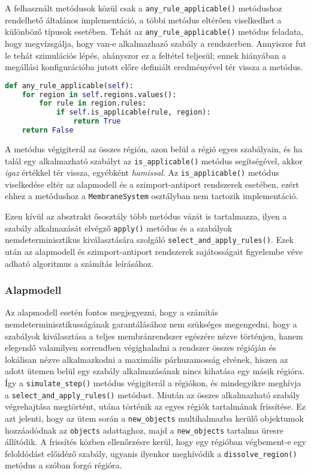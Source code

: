 A felhasznált metódusok közül csak a \verb|any_rule_applicable()| metódushoz rendelhető általános implementáció, a többi metódus eltérően viselkedhet a különböző típusok esetében. Tehát az \verb|any_rule_applicable()| metódus feladata, hogy megvizsgálja, hogy van-e alkalmazhazó szabály a rendszerben. Annyiszor fut le tehát szimulációs lépés, ahányszor ez a feltétel teljesül; ennek hiányában a megállási konfigurációba jutott előre definiált eredményével tér vissza a metódus.

\begin{lstlisting}[language={Python}]
def any_rule_applicable(self):
	for region in self.regions.values():
		for rule in region.rules:
			if self.is_applicable(rule, region):
				return True
	return False
\end{lstlisting}

A metódus végigiterál az összes régión, azon belül a régió egyes szabályain, és ha talál egy alkalmazható szabályt az \verb|is_applicable()| metódus segítségével, akkor \textit{igaz} értékkel tér vissza, egyébként \textit{hamissal}.
Az \verb|is_applicable()| metódus viselkedése eltér az alapmodell és a szimport-antiport rendszerek esetében, ezért ehhez a metódushoz a \verb|MembraneSystem| osztályban nem tartozik implementáció.

Ezen kívül az absztrakt ősosztály több metódus vázát is tartalmazza, ilyen a szabály alkalmazását elvégző \verb|apply()| metódus és a szabályok nemdeterminisztikus kiválasztására szolgáló \verb|select_and_apply_rules()|.
Ezek után az alapmodell és szimport-antiport rendszerek sajátosságait figyelembe véve adható algoritmus a számítás leírásához.

\subsubsection{Alapmodell}

Az alapmodell esetén fontos megjegyezni, hogy a számítás nemdeterminisztikusságának garantálásához nem szükséges megengedni, hogy a szabályok kiválasztása a teljes membránrendszer egészére nézve történjen, hanem elegendő valamilyen sorrendben végighaladni a rendszer összes régióján és lokálisan nézve alkalmazkodni a maximális párhuzamosság elvének, hiszen az adott ütemen belül egy szabály alkalmazásának nincs kihatása egy másik régióra. Így a \verb|simulate_step()| metódus végigiterál a régiókon, és mindegyikre meghívja a \verb|select_and_apply_rules()| metódust. Miután az összes alkalmazható szabály végrehajtása megtörtént, utána történik az egyes régiók tartalmának frissítése. Ez azt jelenti, hogy az ütem során a \verb|new_objects| multihalmazba kerülő objektumok hozzáadódnak az \verb|objects| adattaghoz, majd a \verb|new_objects| tartalma üresre állítódik. A frissítés közben ellenőrzésre kerül, hogy egy régióban végbement-e egy feloldódást előidéző szabály, ugyanis ilyenkor meghívódik a \verb|dissolve_region()| metódus a szóban forgó régióra. 

